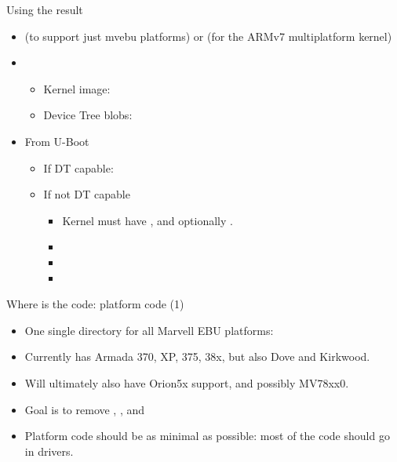 \begin{frame}{Using the result}

\begin{itemize}
\item {} (to support just mvebu platforms) or
   (for the ARMv7 multiplatform kernel)
\item {}
  \begin{itemize}
  \item Kernel image: 
  \item Device Tree blobs: 
  \end{itemize}
\item From U-Boot
  \begin{itemize}
  \item If DT capable: 
  \item If not DT capable
    \begin{itemize}
    \item Kernel must have , and
      optionally .
    \item {}
    \item {}
    \item {}
    \end{itemize}
  \end{itemize}
\end{itemize}

\end{frame}

\begin{frame}{Where is the code: platform code (1)}

\begin{itemize}
\item One single directory for all Marvell EBU platforms:
\item Currently has Armada 370, XP, 375, 38x, but also Dove and
  Kirkwood.
\item Will ultimately also have Orion5x support, and possibly MV78xx0.
\item Goal is to remove , ,
   and 
\item Platform code should be as minimal as possible: most of the code
  should go in drivers.
\end{itemize}

\end{frame}

